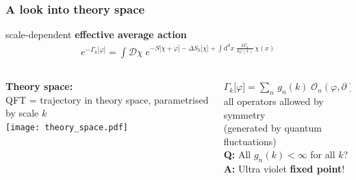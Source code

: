 \documentclass[]{beamer}  %
\begin{document}
\begin{frame}
  \frametitle{A look into theory space}
  scale-dependent \textbf{effective average action}
  \begin{align*}
    \boxed{
    e^{ - \Gamma_k \lbrack \varphi \rbrack }
    = \int \mathcal D \chi \;
    e^{
      - S \lbrack \chi + \varphi \rbrack
      - \Delta S_k \lbrack \chi \rbrack
      + \int \mathrm d^dx \;
      \frac{ \delta \Gamma_k }{ \delta \varphi (x) }
      \, \chi(x)
    }
    }
  \end{align*}
  \vspace{2pt}

  \begin{columns}[T]
    \begin{column}{.4\textwidth}
      \textbf{Theory space:}\\[5pt]
      QFT = trajectory in theory space,
      parametrised by scale $k$\\[25pt]
        \texttt{[image: theory\_space.pdf]}
    \end{column}
    \begin{column}{.6\textwidth}
      \begin{center}
        $\Gamma_k \lbrack \varphi \rbrack = \sum_n \, g_n(k) \; \mathcal O_n(\varphi, \partial)$\\[5pt]
        all operators allowed by symmetry\\[3pt]
        (generated by quantum fluctuations)\\[20pt]
        \pause
        \textbf{Q:} All $g_n(k)<\infty$ for all $k$?\\[5pt]
        \textbf{A:} Ultra violet \textbf{fixed point}!
      \end{center}
    \end{column}
  \end{columns}
\end{frame}
\end{document}
